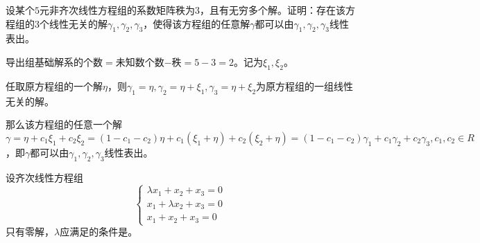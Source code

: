 \documentclass[a4paper]{report}
\begin{document}
\EX 设某个$5$元非齐次线性方程组的系数矩阵秩为3，且有无穷多个解。证明：存在该方程组的3个线性无关的解$\gamma_1,\gamma_2,\gamma_3$，使得该方程组的任意解$\gamma$都可以由$\gamma_1,\gamma_2,\gamma_3$线性表出。

\begin{zhengming}
导出组基础解系的个数$=$未知数个数$-$秩$=5-3=2$。记为$\xi_1,\xi_2$。

任取原方程组的一个解$\eta$，则$\gamma_1=\eta,\gamma_2=\eta+\xi_1,\gamma_3=\eta+\xi_2$为原方程组的一组线性无关的解。

那么该方程组的任意一个解$\gamma = \eta+c_1\xi_1+c_2\xi_2=(1-c_1-c_2)\eta+c_1(\xi_1+\eta)+c_2(\xi_2+\eta)=(1-c_1-c_2)\gamma_1+c_1\gamma_2+c_2\gamma_3,c_1,c_2\in R$，即$\gamma$都可以由$\gamma_1,\gamma_2,\gamma_3$线性表出。
\end{zhengming}

\EX 设齐次线性方程组
\begin{equation*}
\begin{cases}
\lambda x_1+x_2+x_3=0\\
x_1+\lambda x_2+x_3=0\\
x_1+x_2+x_3=0
\end{cases}
\end{equation*}
只有零解，$\lambda$应满足的条件是\underline{\hphantom{~~~~~~~~~~~~~~}}。
\end{document}
